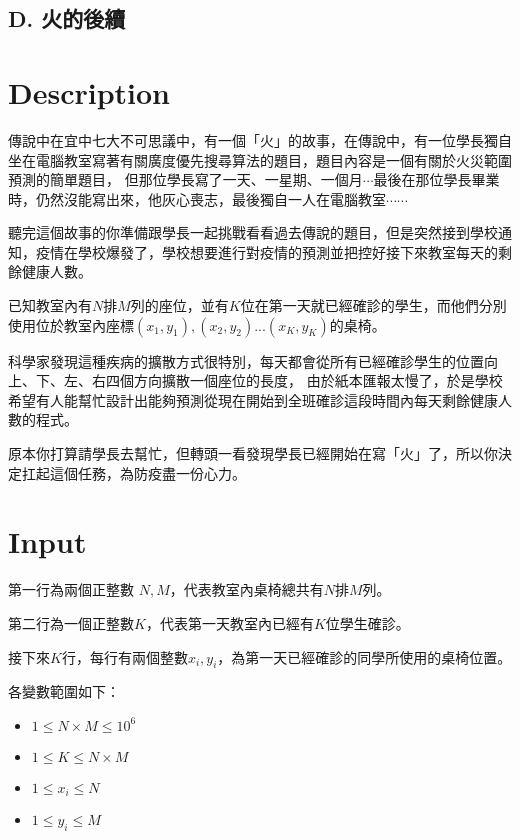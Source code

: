 \documentclass[11pt,a4paper]{article}
\begin{document}
\begin{center}
\section*{D. 火的後續}
\end{center}

\section*{Description}

傳說中在宜中七大不可思議中，有一個「火」的故事，在傳說中，有一位學長獨自坐在電腦教室寫著有關廣度優先搜尋算法的題目，題目內容是一個有關於火災範圍預測的簡單題目，
但那位學長寫了一天、一星期、一個月$\cdots$最後在那位學長畢業時，仍然沒能寫出來，他灰心喪志，最後獨自一人在電腦教室$\cdots\cdots$

聽完這個故事的你準備跟學長一起挑戰看看過去傳說的題目，但是突然接到學校通知，疫情在學校爆發了，學校想要進行對疫情的預測並把控好接下來教室每天的剩餘健康人數。

已知教室內有$N$排$M$列的座位，並有$K$位在第一天就已經確診的學生，而他們分別使用位於教室內座標$(x_1, y_1), (x_2, y_2)... (x_K, y_K)$的桌椅。

科學家發現這種疾病的擴散方式很特別，每天都會從所有已經確診學生的位置向上、下、左、右四個方向擴散一個座位的長度，
由於紙本匯報太慢了，於是學校希望有人能幫忙設計出能夠預測從現在開始到全班確診這段時間內每天剩餘健康人數的程式。 

原本你打算請學長去幫忙，但轉頭一看發現學長已經開始在寫「火」了，所以你決定扛起這個任務，為防疫盡一份心力。

	
\section*{Input}

第一行為兩個正整數 $N, M$，代表教室內桌椅總共有$N$排$M$列。

第二行為一個正整數$K$，代表第一天教室內已經有$K$位學生確診。 

接下來$K$行，每行有兩個整數$x_i,y_i$，為第一天已經確診的同學所使用的桌椅位置。

各變數範圍如下：
\begin{itemize}
    \item $1 \le N \times M \le 10^6$
    \item $1 \le K \le N \times M$
    \item $1 \le x_i \leq N$
    \item $1 \le y_i \leq M$
\end{itemize}\
\end{document}
